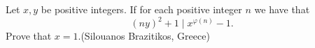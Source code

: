 Let $x,y$ be positive integers. If for each positive integer $n$ we have that $$(ny)^2+1\mid x^{\varphi(n)}-1.$$Prove that $x=1$.(Silouanos Brazitikos, Greece)